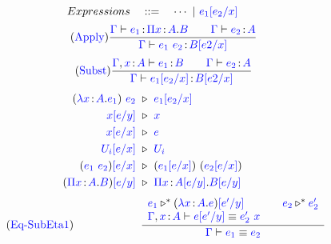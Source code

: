 \begin{figure}
\renewcommand{\arraystretch}{1.3}
	\begin{equation*}
		Expressions \quad ::= \quad \cdots\ |\ \helper{e_1\sub{e_2}{x}} 
	\end{equation*}
	\begin{equation}
		\tag{\helper{Apply}}
		\frac
			{\helper{\Gamma} \vdash \helper{e_1} \goodcolon \helper{\Pi x} \goodcolon \helper{A}. \helper{B} \qquad 
			\helper{\Gamma} \vdash \helper{e_2} \goodcolon \helper{A}}
			{\helper{\Gamma} 	\vdash \helper{e_1} \ \helper{e_2} \goodcolon \helper{B\sub{e2}{x}}}
	\end{equation}
	\begin{equation}
		\tag{\helper{Subst}}
		\frac
			{\helper{\Gamma}, \helper{x} \goodcolon \helper{A} \vdash \helper{e_1} \goodcolon \helper{B} \qquad 
			 \helper{\Gamma} \vdash \helper{e_2} \goodcolon \helper{A}}
			{\helper{\Gamma} \vdash \helper{e_1\sub{e_2}{x}} \goodcolon \helper{B\sub{e2}{x}}}
	\end{equation}
	\begin{align*}
		(\helper{\lambda x} \goodcolon \helper{A} . \helper{e_1})\ \helper{e_2}\ &\triangleright\ \helper{e_1\sub{e_2}{x}}\\
		\helper{x\sub{e}{y}}\ &\triangleright\ \helper{x}\\
		\helper{x\sub{e}{x}}\ &\triangleright\ \helper{e}\\
		\helper{U_i\sub{e}{x}}\ &\triangleright\ \helper{U_i}\\
		(\helper{e_1\ e_2})\helper{\sub{e}{x}}\ &\triangleright\ (\helper{e_1\sub{e}{x}})\ (\helper{e_2\sub{e}{x}}) \\
		(\helper{\Pi x} \goodcolon \helper{A}. \helper{B})\helper{\sub{e}{y}}\ &\triangleright\ 
		\helper{\Pi x} \goodcolon \helper{A\sub{e}{y}}. \helper{B\sub{e}{y}}
	\end{align*}
	\begin{equation}
		\tag{\helper{Eq-SubEta1}}
		\qquad\qquad\qquad
		\frac
			{\begin{array}{l @{\qquad} l}
			\helper{e_1} \triangleright^* (\helper{\lambda x} \goodcolon \helper{A} . \helper{e})\helper{\sub{e'}{y}} &
			 \helper{e_2} \triangleright^* \helper{e_2'}\\
			 \helper{\Gamma}, \helper{x} \goodcolon \helper{A} \vdash \helper{e\sub{e'}{y}} \equiv \helper{e_2'}\ \helper{x}
			 \end{array}
			 }
			{\helper{\Gamma} \vdash \helper{e_1} \equiv \helper{e_2}}
	\end{equation}

\end{figure}
